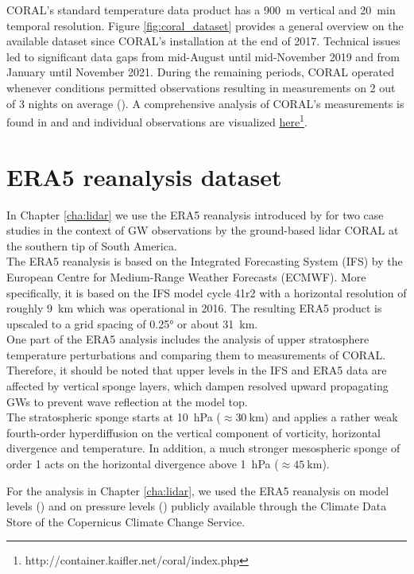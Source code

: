 CORAL's standard temperature data product has a \SI{900}{\meter} vertical and \SI{20}{\minute} temporal resolution. Figure \ref{fig:coral_dataset} provides a general overview on the available dataset since CORAL's installation at the end of 2017. Technical issues led to significant data gaps from mid-August until mid-November 2019 and from January until November 2021. During the remaining periods, CORAL operated whenever conditions permitted observations resulting in measurements on 2 out of 3 nights on average (\cite[]{kaifler_compact_2021}). A comprehensive analysis of CORAL's measurements is found in \textcite{reichert_highcadence_2021} and \textcite{reichert_characterization_2022} and individual observations are visualized \href{http://container.kaifler.net/coral/index.php}{here}\footnote[1]{http://container.kaifler.net/coral/index.php}. 

%

\section{ERA5 reanalysis dataset}
\label{sec:era5}
%
In Chapter \ref{cha:lidar} we use the ERA5 reanalysis introduced by \textcite[]{hersbach_et_al_era5_2020} for two case studies in the context of GW observations by the ground-based lidar CORAL at the southern tip of South America.\\
The ERA5 reanalysis is based on the Integrated Forecasting System (IFS) by the European Centre for Medium-Range Weather Forecasts (ECMWF). More specifically, it is based on the IFS model cycle 41r2 with a horizontal resolution of roughly \SI{9}{\kilo\meter} which was operational in 2016. The resulting ERA5 product is upscaled to a grid spacing of 0.25° or about \SI{31}{\kilo\meter}.\\
One part of the ERA5 analysis includes the analysis of upper stratosphere temperature perturbations and comparing them to measurements of CORAL. Therefore, it should be noted that upper levels in the IFS and ERA5 data are affected by vertical sponge layers, which dampen resolved upward propagating GWs to prevent wave reflection at the model top.\\
The stratospheric sponge starts at \SI{10}{hPa} ($\approx \SI{30}{\kilo\meter}$) and applies a rather weak fourth-order hyperdiffusion on the vertical component of vorticity, horizontal divergence and temperature. In addition, a much stronger mesospheric sponge of order 1 acts on the horizontal divergence above \SI{1}{hPa} ($\approx \SI{45}{\kilo\meter}$).

For the analysis in Chapter \ref{cha:lidar}, we used the ERA5 reanalysis on model levels (\cite[]{hersbach_era5_2018}) and on pressure levels (\cite{hersbach_era5_2018-1}) publicly available through the Climate Data Store of the Copernicus Climate Change Service.

